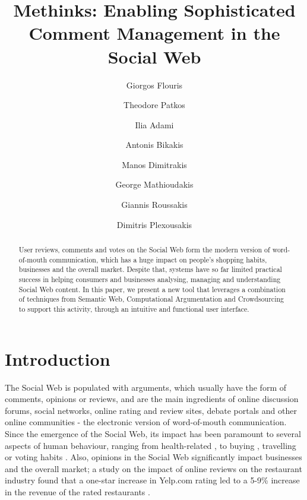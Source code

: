 \documentclass[runningheads,a4paper]{llncs}
\begin{document}
\mainmatter

\title{Methinks: Enabling Sophisticated Comment Management in the Social Web}
\author{Giorgos Flouris \and
Theodore Patkos \and
Ilia Adami \and
Antonis Bikakis \and
Manos Dimitrakis \and
George Mathioudakis \and
Giannis Roussakis \and
Dimitris Plexousakis}
\maketitle

\begin{abstract}
User reviews, comments and votes on the Social Web form the modern version of word-of-mouth communication, which has a huge impact on people's shopping habits, businesses and the overall market. Despite that, systems have so far limited practical success in helping consumers and businesses analysing, managing and understanding Social Web content. In this paper, we present a new tool that leverages a combination of techniques from Semantic Web, Computational Argumentation and Crowdsourcing to support this activity, through an intuitive and functional user interface.

\end{abstract}


\section{Introduction}

The Social Web is populated with arguments, which usually have the form of comments, opinions or reviews, and are the main ingredients of online discussion forums, social networks, online rating and review sites, debate portals and other online communities - the electronic version of word-of-mouth communication. Since the emergence of the Social Web, its impact has been paramount to several aspects of human behaviour, ranging from health-related  \cite{_Ref490737972}, to buying  \cite{_Ref490738051}, travelling  \cite{_Ref490738065} or voting habits  \cite{_Ref490738076}. Also, opinions in the Social Web significantly impact businesses and the overall market; a study on the impact of online reviews on the restaurant industry found that a one-star increase in Yelp.com rating led to a 5-9\% increase in the revenue of the rated restaurants  \cite{_Ref490738087}.
\end{document}
